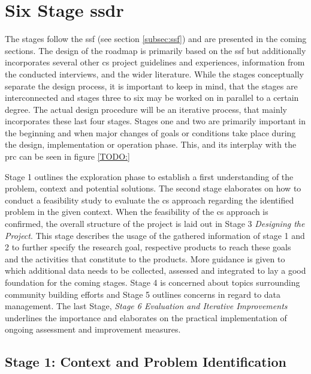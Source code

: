 \section{Six Stage \acrshort{ssdr}}\label{sec:ssdr}
The stages follow the \acrlong{ssf} (see section \ref*{subsec:ssf}) and are presented in the coming sections. The design of the roadmap is primarily based on the \acrshort{ssf} but additionally incorporates several other \acrshort{cs} project guidelines and experiences, information from the conducted interviews, and the wider literature. While the stages conceptually separate the design process, it is important to keep in mind, that the stages are interconnected and stages three to six may be worked on in parallel to a certain degree. The actual design procedure will be an iterative process, that mainly incorporates these last four stages. Stages one and two are primarily important in the beginning and when major changes of goals or conditions take place during the design, implementation or operation phase. This, and its interplay with the \acrshort{prc} can be seen in figure \ref{TODO:}\newline


Stage 1 outlines the exploration phase to establish a first understanding of the problem, context and potential solutions. The second stage elaborates on how to conduct a feasibility study to evaluate the \acrshort{cs} approach regarding the identified problem in the given context. When the feasibility of the \acrshort{cs} approach is confirmed, the overall structure of the project is laid out in Stage 3 \textit{Designing the Project}. This stage describes the usage of the gathered information of stage 1 and 2 to further specify the research goal, respective products to reach these goals and the activities that constitute to the products. More guidance is given to which additional data needs to be collected, assessed and integrated to lay a good foundation for the coming stages. Stage 4 is concerned about topics surrounding community building efforts and Stage 5 outlines concerns in regard to data management. The last Stage, \textit{Stage 6 Evaluation and Iterative Improvements} underlines the importance and elaborates on the practical implementation of ongoing assessment and improvement measures.

\subsection{Stage 1: Context and Problem Identification}\label{subsec:stage1_design}

